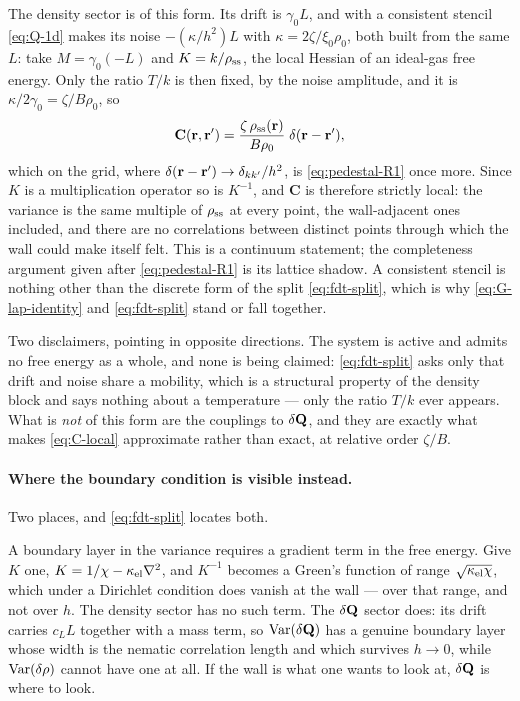 \documentclass[a5paper]{article}
\begin{document}
The density sector is of this form. Its drift is $\gamma_0L$, and with a consistent stencil \eqref{eq:Q-1d} makes its noise $-(\kappa/h^2)L$ with $\kappa = 2\zeta/\xi_0\rho_0$, both built from the same $L$: take $M=\gamma_0(-L)$ and $K = k/\rho_\ss$, the local Hessian of an ideal-gas free energy. Only the ratio $T/k$ is then fixed, by the noise amplitude, and it is $\kappa/2\gamma_0 = \zeta/B\rho_0$, so
\begin{equation}
    \label{eq:C-local}
    \mathbf{C}(\r,\r') = \frac{\zeta\,\rho_\ss(\r)}{B\rho_0}\;\delta(\r-\r'),
\end{equation}
which on the grid, where $\delta(\r-\r')\to\delta_{kk'}/h^2$, is \eqref{eq:pedestal-R1} once more. Since $K$ is a multiplication operator so is $K^{-1}$, and $\mathbf{C}$ is therefore strictly local: the variance is the same multiple of $\rho_\ss$ at every point, the wall-adjacent ones included, and there are no correlations between distinct points through which the wall could make itself felt. This is a continuum statement; the completeness argument given after \eqref{eq:pedestal-R1} is its lattice shadow. A consistent stencil is nothing other than the discrete form of the split \eqref{eq:fdt-split}, which is why \eqref{eq:G-lap-identity} and \eqref{eq:fdt-split} stand or fall together.

Two disclaimers, pointing in opposite directions. The system is active and admits no free energy as a whole, and none is being claimed: \eqref{eq:fdt-split} asks only that drift and noise share a mobility, which is a structural property of the density block and says nothing about a temperature --- only the ratio $T/k$ ever appears. What is \emph{not} of this form are the couplings to $\delta\Q$, and they are exactly what makes \eqref{eq:C-local} approximate rather than exact, at relative order $\zeta/B$.

\paragraph{Where the boundary condition is visible instead.} Two places, and \eqref{eq:fdt-split} locates both.

A boundary layer in the variance requires a gradient term in the free energy. Give $K$ one, $K = 1/\chi - \kappa_{\rm el}\nabla^2$, and $K^{-1}$ becomes a Green's function of range $\sqrt{\kappa_{\rm el}\chi}$, which under a Dirichlet condition does vanish at the wall --- over that range, and not over $h$. The density sector has no such term. The $\delta\Q$ sector does: its drift carries $c_LL$ together with a mass term, so $\Var(\delta\Q)$ has a genuine boundary layer whose width is the nematic correlation length and which survives $h\to0$, while $\Var(\delta\rho)$ cannot have one at all. If the wall is what one wants to look at, $\delta\Q$ is where to look.
\end{document}
